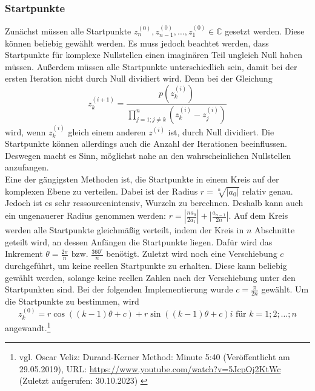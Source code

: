 \documentclass[12pt]{article}
\begin{document}
\subsubsection{Startpunkte}
Zunächst müssen alle Startpunkte $z_n^{(0)},z_{n-1}^{(0)},\dots,z_1^{(0)} \in \mathbb{C}$ gesetzt werden. Diese können beliebig gewählt werden. Es muss jedoch beachtet werden, dass Startpunkte für komplexe Nullstellen einen imaginären Teil ungleich Null haben müssen. Außerdem müssen alle Startpunkte unterschiedlich sein, damit bei der ersten Iteration nicht durch Null dividiert wird. Denn bei der Gleichung
\begin{equation*}
    z_k^{(i+1)} = \frac{p(z_{k}^{(i)})}{\prod_{j=1;j\neq k}^{n}(z_{k}^{(i)}-z_j^{(i)})}
\end{equation*}
wird, wenn $z_{k}^{(i)}$ gleich einem anderen $z^{(i)}$ ist, durch Null dividiert.
Die Startpunkte können allerdings auch die Anzahl der Iterationen beeinflussen. Deswegen macht es Sinn, möglichst nahe an den wahrscheinlichen Nullstellen anzufangen.\\
Eine der gängigsten Methoden ist, die Startpunkte in einem Kreis auf der komplexen Ebene zu verteilen. Dabei ist der Radius $r = \sqrt[n]{|a_0|}$ relativ genau. Jedoch ist es sehr ressourcenintensiv, Wurzeln zu berechnen. Deshalb kann auch ein ungenauerer Radius genommen werden: $r = |\frac{na_0}{2a_1}| + |\frac{a_{n-1}}{2n}|$.
Auf dem Kreis werden alle Startpunkte gleichmäßig verteilt, indem der Kreis in $n$ Abschnitte geteilt wird, an dessen Anfängen die Startpunkte liegen. Dafür wird das Inkrement $\theta = \frac{2\pi}{n} \text{ bzw. } \frac{360^\circ}{n}$ benötigt. Zuletzt wird noch eine Verschiebung $c$ durchgeführt, um keine reellen Startpunkte zu erhalten. Diese kann beliebig gewählt werden, solange keine reellen Zahlen nach der Verschiebung unter den Startpunkten sind. Bei der folgenden Implementierung wurde $c = \frac{\pi}{2n}$ gewählt.
Um die Startpunkte zu bestimmen, wird 
\[z_{k}^{(0)} = r\cos((k-1)\theta+c)+r\sin((k-1)\theta+c)i \text{ für } k=1;2;\dots;n\]
angewandt.\footnote{
    vgl. Oscar Veliz: Durand-Kerner Method: Minute 5:40 (Veröffentlicht am 29.05.2019), URL: \url{https://www.youtube.com/watch?v=5JcpOj2KtWc} (Zuletzt aufgerufen: 30.10.2023) \label{ftn:OscarVilez,5:40}
}
\end{document}

